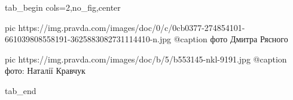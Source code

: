  
 
 
 
 


\ifcmt
  tab_begin cols=2,no_fig,center

     pic https://img.pravda.com/images/doc/0/c/0cb0377-274854101-661039808558191-3625883082731114410-n.jpg
		 @caption фото Дмитра Рясного

		 pic https://img.pravda.com/images/doc/b/5/b553145-nkl-9191.jpg
		 @caption фото: Наталії Кравчук

  tab_end
\fi

